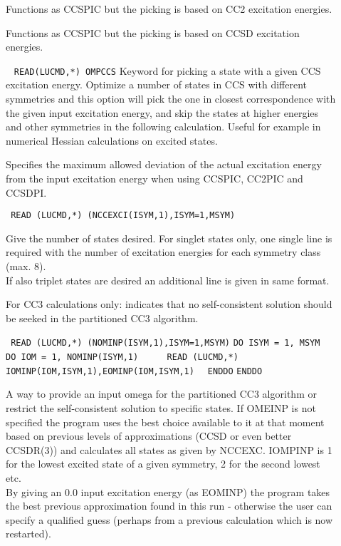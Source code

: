 \begin{description}
\item[] 
Functions as CCSPIC but the picking is based on CC2 excitation energies.
\item[] 
Functions as CCSPIC but the picking is based on CCSD excitation energies.
%
\item[] \verb| |\newline 
\verb|READ(LUCMD,*) OMPCCS| \newline
Keyword for picking a state with a given CCS excitation energy.
Optimize a number of states in CCS with different symmetries and this option
will pick the one in closest correspondence with the given input excitation
energy, and skip the states at higher energies and other symmetries in 
the following calculation.
Useful for example in numerical Hessian calculations on excited states.

\item[] 
Specifies the maximum allowed deviation of the actual excitation energy
from the input excitation energy when using CCSPIC, CC2PIC and CCSDPI. 

\item[] \verb| |\newline
\verb|READ (LUCMD,*) (NCCEXCI(ISYM,1),ISYM=1,MSYM)|

Give the number of states desired.
For singlet states only, one single line is required with
the number of excitation energies for each symmetry class (max. 8). \\ 
If also triplet states are desired an additional line is given in same format. 
%
\item[] 
%
For CC3 calculations only: indicates that no self-consistent solution
should be seeked in the partitioned CC3 algorithm.

\item[]\verb| |\newline
%
\verb|READ (LUCMD,*) (NOMINP(ISYM,1),ISYM=1,MSYM)|\newline
\verb|DO ISYM = 1, MSYM|\newline
\verb|  DO IOM = 1, NOMINP(ISYM,1)|\newline
\verb|     READ (LUCMD,*) IOMINP(IOM,ISYM,1),EOMINP(IOM,ISYM,1)|\newline
\verb|  ENDDO|\newline
\verb|ENDDO|

A way to provide an input omega for the partitioned CC3 algorithm or restrict
the self-consistent solution to specific states.
If OMEINP is not specified the program uses the best choice available to it at that
moment based on previous levels of approximations (CCSD or even better CCSDR(3)) 
and calculates all states as given by NCCEXC.
IOMPINP is 1 for the lowest excited state of a given symmetry, 2 for the second lowest etc. \\
By giving an 0.0 input excitation energy (as EOMINP) the program takes the best previous
approximation found in this run - otherwise the user can specify a qualified guess 
(perhaps from a previous calculation which is now restarted).


\end{description}
